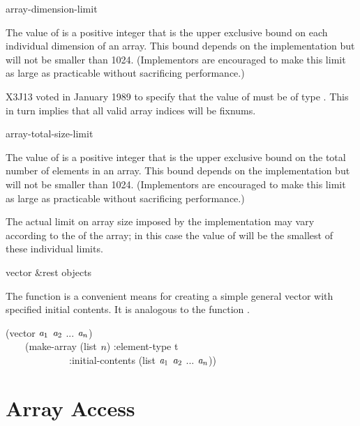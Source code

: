 \begin{defun}[Constant]
array-dimension-limit

The value of  is a positive integer that is
the upper exclusive bound on each individual dimension of an array.
This bound depends on the implementation
but will not be smaller than 1024.
(Implementors are encouraged to make this limit as large as practicable
without sacrificing performance.)

\begin{new}
X3J13 voted in January 1989
to specify that the value
of  must be of type .
This in turn implies that all valid array indices will be fixnums.
\end{new}
\end{defun}

\begin{defun}[Constant]
array-total-size-limit

The value of  is a positive integer that is
the upper exclusive bound on the total number of elements in an array.
This bound depends on the implementation
but will not be smaller than 1024.
(Implementors are encouraged to make this limit as large as practicable
without sacrificing performance.)

The actual limit on array size imposed by the implementation may vary
according to the  of the array; in this case the value of
 will be the smallest of these individual
limits.
\end{defun}

\begin{defun}[Function]
vector &rest objects

The function  is a convenient means for creating
a simple general vector with specified initial contents.
It is analogous to the function .
\begin{lisp}
(vector $\emph{a}_1$ $\emph{a}_2$ ... $\emph{a}_{n}$) \\
~~~\EQ\ (make-array (list $\emph{n}$) :element-type t \\
~~~~~~~~~~~~~:initial-contents (list $\emph{a}_1$ $\emph{a}_2$ ... $\emph{a}_{n}$))
\end{lisp}
\end{defun}

\section{Array Access}

